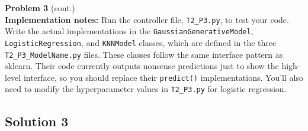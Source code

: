 \documentclass[submit]{harvardml}
\begin{document}
\newpage

\begin{framed}
\noindent\textbf{Problem 3} (cont.)\\


\textbf{Implementation notes:} Run the controller file, \texttt{T2\_P3.py},
to test your code. Write the actual implementations in the \texttt{GaussianGenerativeModel},
\texttt{LogisticRegression}, and \texttt{KNNModel} classes, which are defined in the three
\texttt{T2\_P3\_ModelName.py} files. These classes follow the same interface pattern
as sklearn. Their code
currently outputs nonsense predictions just to show the
high-level interface, so you should replace their \texttt{predict()} implementations.
You'll also need to modify the hyperparameter
values in \texttt{T2\_P3.py} for logistic regression.
\end{framed}


\subsection*{Solution 3}
\end{document}
